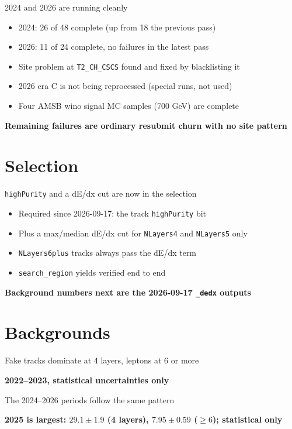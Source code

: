 \documentclass[aspectratio=169,12pt]{beamer}
\newcommand{\takeaway}[1]{\par\vspace{10pt}\centering\small\textbf{#1}\par}
\begin{document}
\begin{frame}{2024 and 2026 are running cleanly}
  \begin{itemize}
    \item 2024: 26 of 48 complete (up from 18 the previous pass)
    \item 2026: 11 of 24 complete, no failures in the latest pass
    \item Site problem at \texttt{T2\_CH\_CSCS} found and fixed by blacklisting it
    \item 2026 era C is not being reprocessed (special runs, not used)
    \item Four AMSB wino signal MC samples (700 GeV) are complete
  \end{itemize}
  \takeaway{Remaining failures are ordinary resubmit churn with no site pattern}
\end{frame}

\section{Selection}
\begin{frame}{\texttt{highPurity} and a dE/dx cut are now in the selection}
  \begin{itemize}
    \item Required since 2026-09-17: the track \texttt{highPurity} bit
    \item Plus a max/median dE/dx cut for \texttt{NLayers4} and \texttt{NLayers5} only
    \item \texttt{NLayers6plus} tracks always pass the dE/dx term
    \item \texttt{search\_region} yields verified end to end
  \end{itemize}
  \takeaway{Background numbers next are the 2026-09-17 \texttt{\_dedx} outputs}
\end{frame}

\section{Backgrounds}
\begin{frame}{Fake tracks dominate at 4 layers, leptons at 6 or more}
  \centering\footnotesize\renewcommand{\arraystretch}{0.8}
  
  \vspace{-4pt}\takeaway{2022--2023, statistical uncertainties only}
\end{frame}

\begin{frame}{The 2024--2026 periods follow the same pattern}
  \centering\footnotesize\renewcommand{\arraystretch}{0.8}
  
  \takeaway{2025 is largest: $29.1 \pm 1.9$ (4 layers), $7.95 \pm 0.59$ ($\geq 6$); statistical only}
\end{frame}
\end{document}
